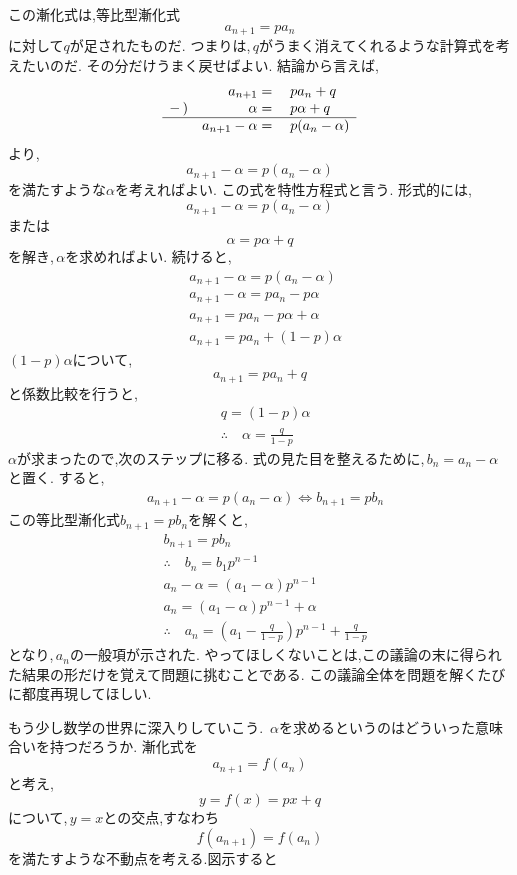   この漸化式は,等比型漸化式
  \[
    a_{n+1}=pa_n
  \]
  に対して$q$が足されたものだ.
  つまりは,\,$q$がうまく消えてくれるような計算式を考えたいのだ.
  その分だけうまく戻せばよい.
  結論から言えば,
  \[
    \begin{array}{rrl}
       & a_{n+1}={} & pa_n+q\\
      -\,) & \alpha={} & p\alpha+q\\ \hline
       & a_{n+1}-\alpha={} & p(a_n-\alpha)
    \end{array}
  \]
  より,
  \[
    a_{n+1}-\alpha=p(a_n-\alpha)
  \]
  を満たすような$\alpha$を考えればよい.
  この式を特性方程式と言う.
  形式的には,
  \[
    a_{n+1}-\alpha=p(a_n-\alpha)
  \]
  または
  \[
    \alpha=p\alpha+q
  \]
  を解き,\,$\alpha$を求めればよい.
  続けると,
  \begin{align*}
    &a_{n+1}-\alpha=p(a_n-\alpha)\\
    &a_{n+1}-\alpha=pa_n-p\alpha\\
    &a_{n+1}=pa_n-p\alpha+\alpha\\
    &a_{n+1}=pa_n+(1-p)\alpha
  \end{align*}
  $(1-p)\alpha$について,
  \[
    a_{n+1}=pa_n+q
  \]
  と係数比較を行うと,
  \begin{align*}
    &q=(1-p)\alpha\\
    &\therefore \quad \alpha=\frac{q}{1-p}
  \end{align*}
  $\alpha$が求まったので,次のステップに移る.
  式の見た目を整えるために,\,$b_n=a_n-\alpha$と置く.
  すると,
  \begin{align*}
    &a_{n+1}-\alpha=p(a_n-\alpha) \iff b_{n+1}=pb_n
  \end{align*}
  この等比型漸化式$b_{n+1}=pb_n$を解くと,
  \begin{align*}
    &b_{n+1}=pb_n\\
    &\therefore \quad b_n=b_1p^{n-1}\\
    &a_n-\alpha=(a_1-\alpha)p^{n-1}\\
    &a_n=(a_1-\alpha)p^{n-1}+\alpha\\
    &\therefore \quad a_n=\left(a_1-\frac{q}{1-p}\right)p^{n-1}+\frac{q}{1-p}
  \end{align*}
  となり,\,$a_n$の一般項が示された.
  やってほしくないことは,この議論の末に得られた結果の形だけを覚えて問題に挑むことである.
  この議論全体を問題を解くたびに都度再現してほしい.

  もう少し数学の世界に深入りしていこう.
  \,$\alpha$を求めるというのはどういった意味合いを持つだろうか.
  漸化式を
  \[
    a_{n+1}=f(a_n)
  \]
  と考え,
  \[
    y=f(x)=px+q
  \]
  について,\,$y=x$との交点,すなわち
  \[
    f(a_{n+1})=f(a_n)
  \]
  を満たすような不動点を考える.図示すると

